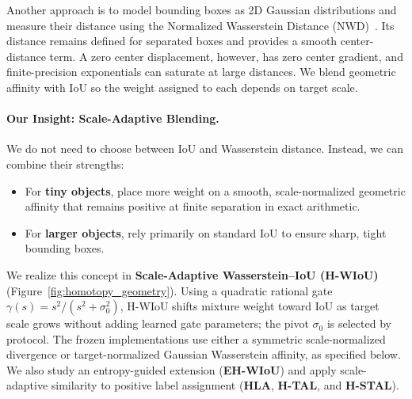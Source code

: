 \documentclass[11pt,a4paper]{article}
\begin{document}
Another approach is to model bounding boxes as 2D Gaussian distributions and measure their distance using the Normalized Wasserstein Distance (NWD)~\cite{wang2021nwd}. Its distance remains defined for separated boxes and provides a smooth center-distance term. A zero center displacement, however, has zero center gradient, and finite-precision exponentials can saturate at large distances. We blend geometric affinity with IoU so the weight assigned to each depends on target scale.

\paragraph{Our Insight: Scale-Adaptive Blending.}
We do not need to choose between IoU and Wasserstein distance. Instead, we can combine their strengths:
\begin{itemize}
  \item For \textbf{tiny objects}, place more weight on a smooth, scale-normalized geometric affinity that remains positive at finite separation in exact arithmetic.
  \item For \textbf{larger objects}, rely primarily on standard IoU to ensure sharp, tight bounding boxes.
\end{itemize}

We realize this concept in \textbf{Scale-Adaptive Wasserstein--IoU (H-WIoU)} (Figure~\ref{fig:homotopy_geometry}). Using a quadratic rational gate $\gamma(s) = s^2 / (s^2 + \sigma_0^2)$, H-WIoU shifts mixture weight toward IoU as target scale grows without adding learned gate parameters; the pivot $\sigma_0$ is selected by protocol. The frozen implementations use either a symmetric scale-normalized divergence or target-normalized Gaussian Wasserstein affinity, as specified below. We also study an entropy-guided extension (\textbf{EH-WIoU}) and apply scale-adaptive similarity to positive label assignment (\textbf{HLA}, \textbf{H-TAL}, and \textbf{H-STAL}).
\end{document}
